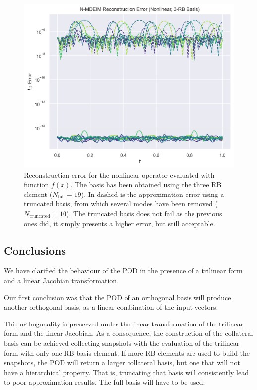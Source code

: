 \documentclass[../../thesis.tex]{subfiles}
\begin{document}
\begin{figure}[h]
    \includegraphics[width=\columnwidth]{research_project/piston/figures/svd_fourier/trilinear_nonlinear/rb_basis_mdeim_errors_nonlinear_num_3.png}
    \caption{Reconstruction error for the nonlinear operator evaluated with function $f(x)$.
    The basis has been obtained using the three RB element ($N_{\text{full}}=19$).
    In dashed is the approximation error using a truncated basis, 
    from which several modes have been removed ($N_{\text{truncated}}=10$). 
    The truncated basis does not fail as the previous ones did, it simply presents a higher error,
    but still acceptable.}
    \label{fig:appendix_rb_nonlinear_num_3}
\end{figure}

\subsection{Conclusions}
We have clarified the behaviour of the POD in the presence of a trilinear form 
and a linear Jacobian transformation.

Our first conclusion was that the POD of an orthogonal basis will produce
another orthogonal basis, as a linear combination of the input vectors.

This orthogonality is preserved under the linear transformation of the trilinear form
and the linear Jacobian.
As a consequence, the construction of the collateral basis can be achieved 
collecting snapshots with the evaluation of the trilinear form with 
only one RB basis element.
If more RB elements are used to build the snapshots, 
the POD will return a larger collateral basis,
but one that will not have a hierarchical property.
That is, truncating that basis will consistently lead to poor approximation results.
The full basis will have to be used.
\end{document}

